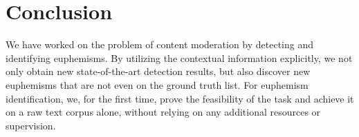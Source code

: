 
\section{Conclusion}
\label{sec:conclusion}

We have worked on the problem of content moderation by detecting and identifying euphemisms. 
By utilizing the contextual information explicitly, we not only obtain new state-of-the-art detection results, but also discover new euphemisms that are not even on the ground truth list. 
For euphemism identification, we, for the first time, prove the feasibility of the task and achieve it on a raw text corpus alone, without relying on any additional resources or supervision. 
